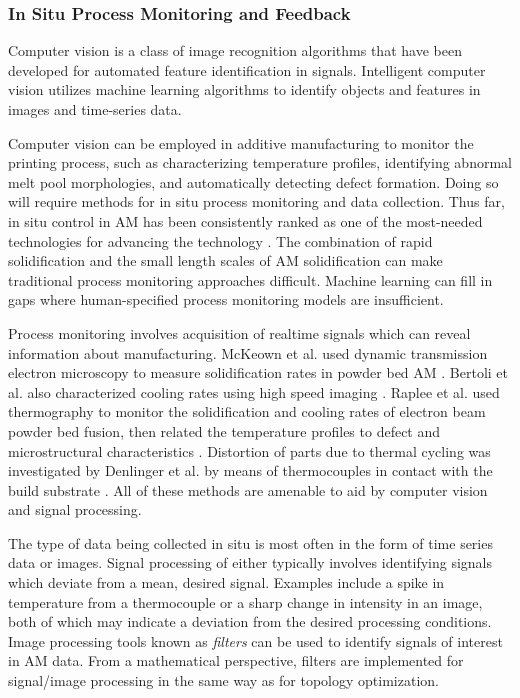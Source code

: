 \subsubsection{In Situ Process Monitoring and Feedback}
Computer vision is a class of image recognition algorithms that have been developed for automated feature identification in signals. Intelligent computer vision utilizes machine learning algorithms to identify objects and features in images and time-series data. 

Computer vision can be employed in additive manufacturing to monitor the printing process, such as characterizing temperature profiles, identifying abnormal melt pool morphologies, and automatically detecting defect formation. Doing so will require methods for in situ process monitoring and data collection. Thus far, in situ control in AM has been consistently ranked as one of the most-needed technologies for advancing the technology \cite{Berumen2010, Tapia2014, Mani2017}. The combination of rapid solidification and the small length scales of AM solidification can make traditional process monitoring approaches difficult. Machine learning can fill in gaps where human-specified process monitoring models are insufficient.

Process monitoring involves acquisition of realtime signals which can reveal information about manufacturing. McKeown et al. used dynamic transmission electron microscopy to measure solidification rates in powder bed AM \cite{McKeown2016}. Bertoli et al. also characterized cooling rates using high speed imaging \cite{Bertoli2017}. Raplee et al. used thermography to monitor the solidification and cooling rates of electron beam powder bed fusion, then related the temperature profiles to defect and microstructural characteristics \cite{Raplee2017}. Distortion of parts due to thermal cycling was investigated by Denlinger et al. by means of thermocouples in contact with the build substrate \cite{Denlinger2015}. All of these methods are amenable to aid by computer vision and signal processing.

The type of data being collected in situ is most often in the form of time series data or images. Signal processing of either typically involves identifying signals which deviate from a mean, desired signal. Examples include a spike in temperature from a thermocouple or a sharp change in intensity in an image, both of which may indicate a deviation from the desired processing conditions. Image processing tools known as \textit{filters} can be used to identify signals of interest in AM data. From a mathematical perspective, filters are implemented for signal/image processing in the same way as for topology optimization. 

